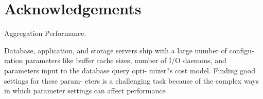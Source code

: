 \section{Acknowledgements}
\indent


\cite{macedo10matrices}
Aggregation Performance.







Database, application, and storage servers ship with a large number of configu- ration parameters like buffer cache sizes, number of I/O daemons, and parameters input to the database query opti- mizer?s cost model. Finding good settings for these param- eters is a challenging task because of the complex ways in which parameter settings can affect performance
